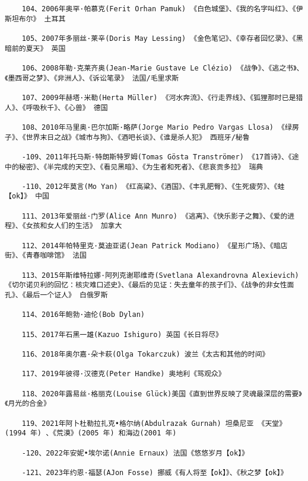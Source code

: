\documentclass[UTF8]{../RepresentationUniverse}
\begin{document}
\begin{lstlisting}
    104、2006年奥罕·帕慕克(Ferit Orhan Pamuk) 《白色城堡》、《我的名字叫红》、《伊斯坦布尔》 土耳其
    
    105、2007年多丽丝·莱辛(Doris May Lessing) 《金色笔记》、《幸存者回忆录》、《黑暗前的夏天》 英国
    
    106、2008年勒·克莱齐奥(Jean-Marie Gustave Le Clézio) 《战争》、《逃之书》、《墨西哥之梦》、《非洲人》、《诉讼笔录》 法国/毛里求斯
    
    107、2009年赫塔·米勒(Herta Müller) 《河水奔流》、《行走界线》、《狐狸那时已是猎人》、《呼吸秋千》、《心兽》 德国
    
    108、2010年马里奥·巴尔加斯·略萨(Jorge Mario Pedro Vargas Llosa) 《绿房子》、《世界末日之战》《城市与狗》、《酒吧长谈》、《谁是杀人犯》 西班牙/秘鲁
    
    -109、2011年托马斯·特朗斯特罗姆(Tomas Gösta Tranströmer) 《17首诗》、《途中的秘密》、《半完成的天空》、《看见黑暗》、《为生者和死者》、《悲哀贡多拉》 瑞典
    
    -110、2012年莫言(Mo Yan) 《红高粱》、《酒国》、《丰乳肥臀》、《生死疲劳》、《蛙【ok】》 中国
    
    111、2013年爱丽丝·门罗(Alice Ann Munro) 《逃离》、《快乐影子之舞》、《爱的进程》、《女孩和女人们的生活》 加拿大
    
    112、2014年帕特里克·莫迪亚诺(Jean Patrick Modiano) 《星形广场》、《暗店街》、《青春咖啡馆》 法国
    
    113、2015年斯维特拉娜·阿列克谢耶维奇(Svetlana Alexandrovna Alexievich) 《切尔诺贝利的回忆：核灾难口述史》、《最后的见证：失去童年的孩子们》、《战争的非女性面孔》、《最后一个证人》 白俄罗斯
    
    114、2016年鲍勃·迪伦(Bob Dylan) 
    
    115、2017年石黑一雄(Kazuo Ishiguro) 英国《长日将尽》
    
    116、2018年奥尔嘉·朵卡萩(Olga Tokarczuk) 波兰《太古和其他的时间》
    
    117、2019年彼得·汉德克(Peter Handke) 奥地利《骂观众》
    
    118、2020年露易丝·格丽克(Louise Glück)美国《直到世界反映了灵魂最深层的需要》《月光的合金》
    
    119、2021年阿卜杜勒拉扎克•格尔纳(Abdulrazak Gurnah) 坦桑尼亚 《天堂》(1994 年) 、《荒漠》(2005 年) 和海边(2001 年) 

    -120、2022年安妮•埃尔诺(Annie Ernaux) 法国《悠悠岁月【ok】》

    -121、2023年约恩·福瑟(AJon Fosse) 挪威《有人将至【ok】》、《秋之梦【ok】》
\end{lstlisting}
\end{document}
